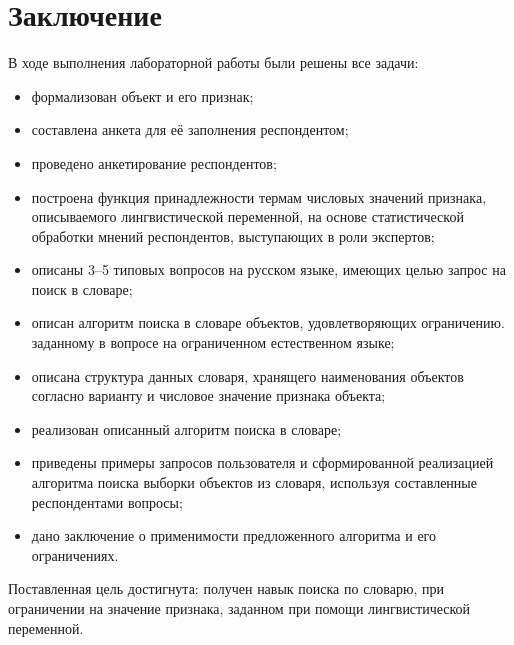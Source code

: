 \chapter*{\hfill{\centering Заключение}\hfill}

В ходе выполнения лабораторной работы были решены все задачи:

\begin{itemize}[label=---] 
	\item формализован объект и его признак;
\item составлена анкета для её заполнения респондентом;
\item проведено анкетирование респондентов;
\item построена функция принадлежности термам числовых значений признака, описываемого лингвистической переменной, на основе статистической обработки мнений респондентов, выступающих в роли экспертов; 
\item описаны 3--5 типовых вопросов на русском языке, имеющих целью запрос на поиск в словаре;
\item описан алгоритм поиска в словаре объектов, удовлетворяющих ограничению. заданному в вопросе на ограниченном естественном языке;
\item описана структура данных словаря, хранящего наименования объектов согласно варианту и числовое значение признака объекта;
\item реализован описанный алгоритм поиска в словаре;
\item приведены примеры запросов пользователя и сформированной реализацией алгоритма поиска выборки объектов из словаря, используя составленные респондентами вопросы;
\item дано заключение о применимости предложенного алгоритма и его ограничениях.
\end{itemize}

Поставленная цель достигнута: получен навык поиска по словарю, при ограничении на значение признака, заданном при помощи лингвистической переменной.
